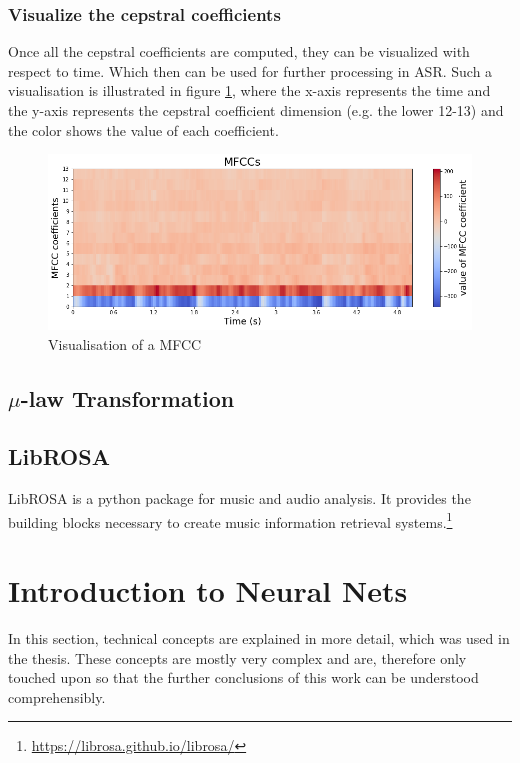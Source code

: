 \subsubsection{Visualize the cepstral coefficients}
Once all the cepstral coefficients are computed, they can be visualized with respect to time. Which then can be used for further processing in \gls{ASR}. Such a visualisation is illustrated in figure \ref{fig:MFCC-Visualisation}, where the x-axis represents the time and the y-axis represents the cepstral coefficient dimension (e.g. the lower 12-13) and the color shows the value of each coefficient.
\begin{figure}[htbp]
	\centering
	\includegraphics[scale=0.5]{baa-documentation/img/MFCC_Visualisation.png}
	\caption[Visualisation of a MFCC]{Visualisation of a MFCC}
	\label{fig:MFCC-Visualisation}
\end{figure}

\subsection{$\mu$-law Transformation}
\label{sub:Mu-Law-Transformation}

\subsection{LibROSA}
\label{sub:Librosa}

LibROSA is a python package for music and audio analysis. It provides the building blocks necessary to create music information retrieval systems.\footnote{\url{https://librosa.github.io/librosa/}}

\section{Introduction to Neural Nets}
\label{sec:Intro-NN}

In this section, technical concepts are explained in more detail, which was used in the thesis. These concepts are mostly very complex and are, therefore only touched upon so that the further conclusions of this work can be understood comprehensibly.

